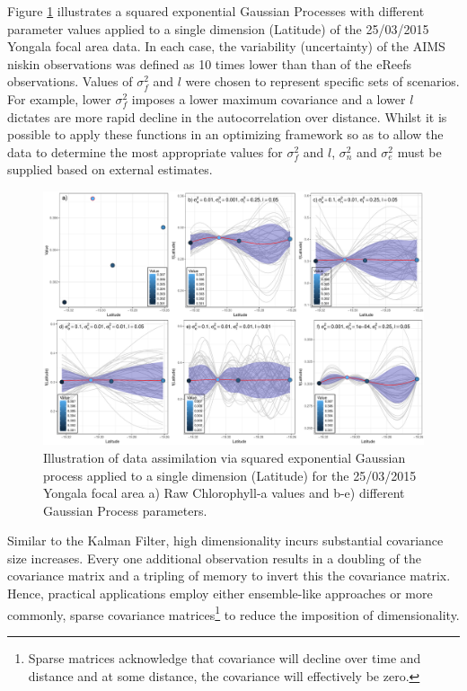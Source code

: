 Figure \ref{fig:focalArea_Spatial.Yongala_Measure_Method2.1.chl} illustrates a squared exponential Gaussian Processes with different parameter values applied to a single dimension (Latitude) of the
25/03/2015 Yongala focal area data.  In each case, the variability (uncertainty) of the AIMS niskin observations was defined as 10 times lower than than of the eReefs observations.
Values of $\sigma_f^2$ and $l$ were chosen to represent specific sets of scenarios.  For example, lower $\sigma_f^2$ imposes a lower maximum covariance and a lower $l$ dictates are
more rapid decline in the autocorrelation over distance.  Whilst it is possible to apply these functions in an optimizing framework so as to allow the data to determine
the most appropriate values for $\sigma_f^2$ and $l$, $\sigma_n^2$ and $\sigma_e^2$ must be supplied based on external estimates.   

\begin{figure}[!hptb]
  \includegraphics[width=\textwidth]{figures/FocalAreas/focalArea_Spatial.Yongala_Measure.chl_Method2.1.pdf}
  \caption{Illustration of data assimilation via squared exponential Gaussian process applied to a single dimension (Latitude) for the 25/03/2015 Yongala focal area a) Raw Chlorophyll-a values and b-e) different Gaussian Process parameters.}\label{fig:focalArea_Spatial.Yongala_Measure_Method2.1.chl}
\end{figure}
  
Similar to the Kalman Filter, high dimensionality incurs substantial covariance size increases.
Every one additional observation results in a doubling of the covariance matrix and a tripling of
memory to invert this the covariance matrix.  Hence, practical applications employ either ensemble-like approaches
or more commonly, sparse covariance matrices\footnote{Sparse matrices acknowledge that covariance will decline over time and distance and at some distance, the covariance will effectively be zero.} to reduce the imposition of dimensionality.

